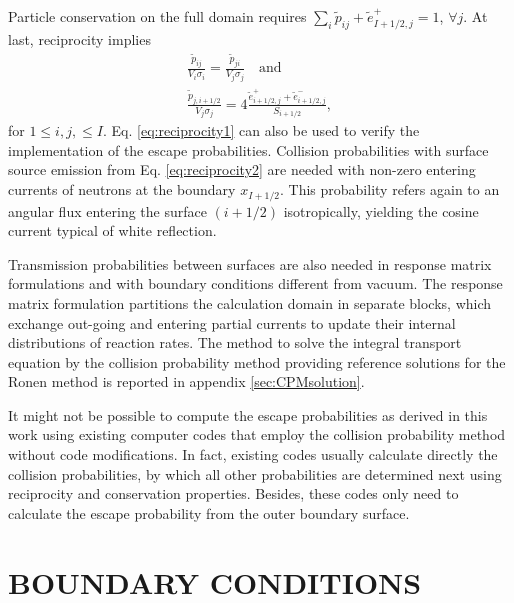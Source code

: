 \documentclass{ictt26}
\begin{document}
Particle conservation on the full domain requires $\sum_i \tilde{p}_{ij} + \tilde{e}^+_{I+1/2,j} = 1$, $\forall j$. At last, reciprocity implies
\begin{subequations}
\label{eq:reciprocity}
\begin{gather}
  \frac{\tilde{p}_{ij}}{V_i \sigma_i} = \frac{\tilde{p}_{ji}}{V_j \sigma_j} \quad \text{and} \label{eq:reciprocity1}\\
  \frac{\tilde{p}_{j, i+1/2}}{V_j \sigma_j} = 4 \frac{\tilde{e}^+_{i+1/2, j} + \tilde{e}^-_{i+1/2, j}}{S_{i+1/2}},
  \label{eq:reciprocity2}
\end{gather}
\end{subequations}
for $1 \leq i,j, \leq I$. %
Eq. \ref{eq:reciprocity1} can also be used to verify the implementation of the escape probabilities. Collision probabilities with surface source emission from Eq. \ref{eq:reciprocity2} are needed with non-zero entering currents of neutrons at the boundary $x_{I+1/2}$. This probability refers again to an angular flux entering the surface $(i+1/2)$ isotropically, yielding the cosine current typical of white reflection.

Transmission probabilities between surfaces are also needed in response matrix formulations and with boundary conditions different from vacuum. The response matrix formulation partitions the calculation domain in separate blocks, which exchange out-going and entering partial currents to update their internal distributions of reaction rates. The method to solve the integral transport equation by the collision probability method providing reference solutions for the Ronen method is reported in appendix \ref{sec:CPMsolution}.

It might not be possible to compute the escape probabilities as derived in this work using existing computer codes that employ the collision probability method without code modifications. In fact, existing codes usually calculate directly the collision probabilities, by which all other probabilities are determined next using reciprocity and conservation properties. Besides, these codes only need to calculate the escape probability from the outer boundary surface.


\section{BOUNDARY CONDITIONS}
\label{sec:bc}
\end{document}

